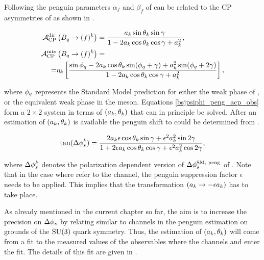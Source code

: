 Following \cite{Faller:2008gt} the penguin parameters $\alpha_f$ and $\beta_f$ of 
can be related to the CP asymmetries of  as shown in .

\begin{subequations}
  \label{bsjpsiphi_peng_acp_obs}
  \begin{align}
    \mathcal{A}_{\rm CP}^{\rm dir}&\left( B_q\rightarrow (f)^k \right) = \frac{ a_k \sin\theta_k \sin\gamma} {1 - 2 a_k \cos\theta_k \cos\gamma + a_k^{2}}, \label{bsjpsiphi_peng_acp_dir} \\
    \mathcal{A}_{\rm CP}^{\rm mix}&\left( B_q\rightarrow (f)^k \right) = \nonumber \\
    = & \eta_k \left[ \frac{\sin\phi_q - 2a_k \cos\theta_k\sin(\phi_q+\gamma) + a_k^2 \sin(\phi_q+2\gamma)}
                                                                 {1 - 2 a_k \cos\theta_k \cos\gamma + a_k^{2}}  \right], \label{bsjpsiphi_peng_acp_mix}
  \end{align}
\end{subequations}

\noindent where $\phi_q$ represents the Standard Model prediction for either the weak phase \phis of ,
or the equivalent weak phase \phid in the \Bd meson\cite{PDG}. Equations \ref{bsjpsiphi_peng_acp_obs} form a $2\times2$ system in
terms of $(a_k,\theta_k)$ that can in principle be solved. After an estimation of $(a_k,\theta_k)$ is available the
penguin shift to \phis could be determined from .

\begin{equation}
\centering
\tan(\Delta\phis^k) = \frac{ 2\akPeng\epsilon\cos\thkPeng \sin\gamma + \epsilon^2\akPeng^2 \sin2\gamma}
                             {1 + 2\epsilon\akPeng \cos\thkPeng \cos\gamma + \epsilon^2\akPeng^2 \cos2\gamma},
\label{tandelta}
\end{equation}

\noindent where $\Delta\phi_{s}^k$ denotes the polarization dependent version of $\Delta\phi_{s}^{\tiny\text {SM, peng}}$ of .
Note that in the case where  refer to the \BsJpsiPhi channel, the penguin suppression factor
$\epsilon$ needs to be applied. This implies that the transformation $(a_k\rightarrow-\epsilon a_k)$ has to take place.

As already mentioned in the current chapter so far, the aim is to increase the precision on $\Delta{\ensuremath{\phi_{s}}}$
by relating similar to \BsJpsiPhi channels in the penguin estimation on grounds of the $\mathrm{SU}(3)$ quark symmetry.
Thus, the estimation of $(a_k,\theta_k)$ will come from a \chisq fit to the measured values of the observables
 where the channels \BsJpsiKst and \BdJpsiRho enter the fit.
The details of this fit are given in .

